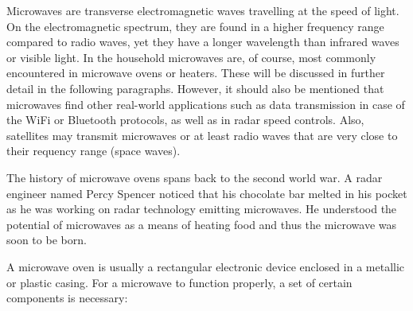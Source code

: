 

Microwaves are transverse electromagnetic waves travelling at the speed of light. On the electromagnetic spectrum, they are found in a higher frequency range compared to radio waves, yet they have a longer wavelength than infrared waves or visible light. In the household microwaves are, of course, most commonly encountered in microwave ovens or heaters. These will be discussed in further detail in the following paragraphs. However, it should also be mentioned that microwaves find other real-world applications such as data transmission in case of the WiFi or Bluetooth protocols, as well as in radar speed controls. Also, satellites may transmit microwaves or at least radio waves that are very close to their requency range (space waves).

The history of microwave ovens spans back to the second world war. A radar engineer named Percy Spencer noticed that his chocolate bar melted in his pocket as he was working on radar technology emitting microwaves. He understood the potential of microwaves as a means of heating food and thus the microwave was soon to be born. 


A microwave oven is usually a rectangular electronic device enclosed in a metallic or plastic casing. For a microwave to function properly, a set of certain components is necessary:

